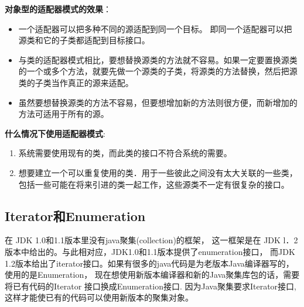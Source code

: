 \documentclass[../main.tex]{subfiles}
\begin{document}
\textbf{对象型的适配器模式的效果}：
%
\begin{itemize}
  \item 一个适配器可以把多种不同的源适配到同一个目标。 即同一个适配器可以把源类和它的子类都适配到目标接口。
  \item 与类的适配器模式相比，要想替换源类的方法就不容易。如果一定要置换源类的一个或多个方法，就要先做一个源类的子类，将源类的方法替换，然后把源类的子类当作真正的源来适配。
  \item 虽然要想替换源类的方法不容易，但要想增加新的方法则很方便，而新增加的方法可适用于所有的源。
\end{itemize}
%
\textbf{什么情况下使用适配器模式}:
\begin{enumerate}
  \item 系统需要使用现有的类，而此类的接口不符合系统的需要。
  \item 想要建立一个可以重复使用的类．用于一些彼此之间没有太大关联的一些类，包括一些可能在将来引进的类一起工作，这些源类不一定有很复杂的接口。
\end{enumerate}
%
\subsection{Iterator和Enumeration}
在 JDK 1.0和1.1版本里没有java聚集(collection)的框架，
这一框架是在 JDK l．2版本中给出的。与此相对应，JDK1.0和1.1版本提供了enumeration接口，
而JDK 1.2版本给出了iterator接口。如果有很多的java代码是为老版本Java编译器写的，使用的是Enumeration，
现在想使用新版本编译器和新的Java聚集库包的话，需要将已有代码的Iterator 接口换成Enumeration接口.
因为Java聚集要求Iterator接口,这样才能使已有的代码可以使用新版本的聚集对象。
\end{document}
